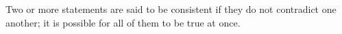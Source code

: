 Two or more statements are said to be consistent if they do not contradict
one another; it is possible for all of them to be true at once.
